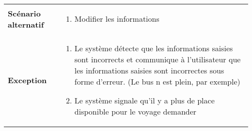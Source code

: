 \begin{longtable}{p{4cm} p{9cm}}
                \textbf{Scénario alternatif} &
                    \begin{enumerate}[leftmargin=*]
                        \item Modifier les informations
                    \end{enumerate}
                \\
                \textbf{Exception} &
                    \begin{enumerate}[leftmargin=*]
                        \item Le système détecte que les informations saisies sont incorrects et communique à
                        l’utilisateur que les informations saisies sont incorrectes sous forme d’erreur.
                        (Le bus n est plein, par exemple)
                        \item Le système signale qu’il y a plus de place disponible pour le voyage
                        demander
                    \end{enumerate}
            \\\bottomrule
        \end{longtable}

